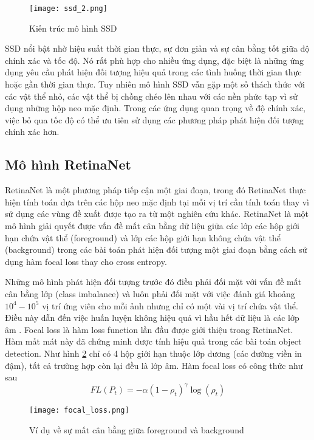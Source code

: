 \documentclass[../the.tex]{subfiles}
\begin{document}
\begin{figure}[H]
	\centering
	\texttt{[image: ssd\_2.png]}
	\caption{Kiến trúc mô hình SSD \cite{Liu_2016}}
	\label{fig:ssd2}
\end{figure}
\bigskip

{\fontsize{13}{12} \selectfont 
SSD nổi bật nhờ hiệu suất thời gian thực, sự đơn giản và sự cân bằng tốt giữa độ chính xác và tốc độ. Nó rất phù hợp cho nhiều ứng dụng, đặc biệt là những ứng dụng yêu cầu phát hiện đối tượng hiệu quả trong các tình huống thời gian thực hoặc gần thời gian thực.
Tuy nhiên mô hình SSD vẫn gặp một số thách thức với các vật thể nhỏ, các vật thể bị chồng chéo lên nhau với các nền phức tạp vì sử dụng những hộp neo mặc định. 
Trong các ứng dụng quan trọng về độ chính xác, việc bỏ qua tốc độ có thể ưu tiên sử dụng các phương pháp phát hiện đối tượng chính xác hơn.

}
\subsection{Mô hình RetinaNet} 
{\fontsize{13}{12} \selectfont  
RetinaNet là một phương pháp tiếp cận một giai đoạn, trong đó RetinaNet thực hiện tính toán dựa trên các hộp neo mặc định tại mỗi vị trí cần tính toán thay vì sử dụng các vùng đề xuất được tạo ra từ một nghiên cứu khác. RetinaNet là một mô hình giải quyết được vấn đề mất cân bằng dữ liệu giữa các lớp các hộp giới hạn chứa vật thể (foreground) và lớp các hộp giới hạn không chứa vật thể (background) trong các bài toán phát hiện đối tượng một giai đoạn 
bằng cách sử dụng hàm focal loss thay cho cross entropy. 


Những mô hình phát hiện đối tượng trước đó điều phải đối mặt với vấn đề mất cân bằng lớp (class imbalance) và luôn phải đối mặt với việc đánh giá khoảng $10^4 - 10^5$ vị trí ứng viên cho mỗi ảnh nhưng chỉ có một vài vị trí chứa vật thể.
Điều này dẫn đến việc huấn luyện không hiệu quả vì hầu hết dữ liệu là các lớp âm \cite{lin2018focal}. Focal loss là hàm loss function lần đầu được giới thiệu trong RetinaNet. Hàm mất mát này đã chứng minh được tính hiệu quả trong các bài toán object detection.
Như hình \ref{fig:focal_loss} chỉ có 4 hộp giới hạn thuộc lớp dương (các đường viền in đậm), tất cả trường hợp còn lại đều là lớp âm. Hàm focal loss có công thức như sau
\begin{equation}
		FL(P_t) = -\alpha(1-\rho_t)^\gamma \log(\rho_t)
\end{equation}
}\begin{figure}[H]
	\centering
	\texttt{[image: focal\_loss.png]}
	\caption{Ví dụ về sự mất cân bằng giữa  foreground và background\cite{lin2018focal}}
	\label{fig:focal_loss}
\end{figure}
\bigskip
\end{document}
